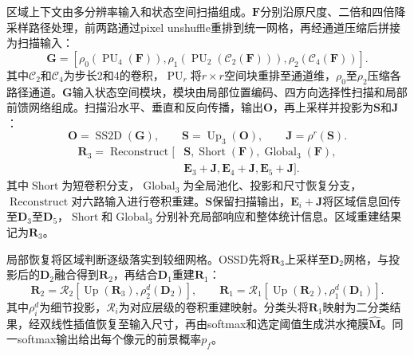 \documentclass[authoryear,preprint,12pt]{elsarticle}
\begin{document}
区域上下文由多分辨率输入和状态空间扫描组成。\(\mathbf F\)分别沿原尺度、二倍和四倍降采样路径处理，前两路通过pixel unshuffle重排到统一网格，再经通道压缩后拼接为扫描输入：
\begin{equation}\label{eq:oscd_scan_input}
 \mathbf G=\left[
 \rho_0\!\left(\operatorname{PU}_{4}(\mathbf F)\right),
 \rho_1\!\left(\operatorname{PU}_{2}(\mathcal C_{2}(\mathbf F))\right),
 \rho_2\!\left(\mathcal C_{4}(\mathbf F)\right)
 \right].
\end{equation}
其中\(\mathcal C_2\)和\(\mathcal C_4\)为步长2和4的卷积，\(\operatorname{PU}_r\)将\(r\times r\)空间块重排至通道维，\(\rho_0\)至\(\rho_2\)压缩各路径通道。\(\mathbf G\)输入状态空间模块，模块由局部位置编码、四方向选择性扫描和局部前馈网络组成\citep{gu2023mamba,liu2024vmamba}。扫描沿水平、垂直和反向传播，输出\(\mathbf O\)，再上采样并投影为\(\mathbf S\)和\(\mathbf J\)：
\begin{equation}\label{eq:oscd_context_flow}
 \mathbf O=\operatorname{SS2D}(\mathbf G),\qquad
 \mathbf S=\operatorname{Up}_{3}(\mathbf O),\qquad
 \mathbf J=\rho^r(\mathbf S).
\end{equation}
\begin{equation}\label{eq:oscd_context_reconstruction}
 \begin{aligned}
 \mathbf R_3=\operatorname{Reconstruct}\!\big[&\mathbf S,\operatorname{Short}(\mathbf F),
 \operatorname{Global}_{3}(\mathbf F),\\
 &\mathbf E_3+\mathbf J,\mathbf E_4+\mathbf J,\mathbf E_5+\mathbf J\big].
 \end{aligned}
\end{equation}
其中\(\operatorname{Short}\)为短卷积分支，\(\operatorname{Global}_3\)为全局池化、投影和尺寸恢复分支，\(\operatorname{Reconstruct}\)对六路输入进行卷积重建。\(\mathbf S\)保留扫描输出，\(\mathbf E_i+\mathbf J\)将区域信息回传至\(\mathbf D_3\)至\(\mathbf D_5\)，\(\operatorname{Short}\)和\(\operatorname{Global}_3\)分别补充局部响应和整体统计信息。区域重建结果记为\(\mathbf R_3\)。

局部恢复将区域判断逐级落实到较细网格。OSSD先将\(\mathbf R_3\)上采样至\(\mathbf D_2\)网格，与投影后的\(\mathbf D_2\)融合得到\(\mathbf R_2\)，再结合\(\mathbf D_1\)重建\(\mathbf R_1\)：
\begin{equation}\label{eq:oscd_reconstruction}
  \mathbf{R}_{2}
  =
  \mathcal{R}_{2}\!\left[
  \operatorname{Up}(\mathbf{R}_{3}),\rho_{2}^{d}(\mathbf{D}_{2})
  \right],
  \qquad
  \mathbf{R}_{1}
  =
  \mathcal{R}_{1}\!\left[
  \operatorname{Up}(\mathbf{R}_{2}),\rho_{1}^{d}(\mathbf{D}_{1})
  \right].
\end{equation}
其中\(\rho_i^d\)为细节投影，\(\mathcal R_i\)为对应层级的卷积重建映射。分类头将\(\mathbf R_1\)映射为二分类结果，经双线性插值恢复至输入尺寸，再由softmax和选定阈值生成洪水掩膜\(\hat{\mathbf M}\)。同一softmax输出给出每个像元的前景概率\(p_f\)。
\end{document}

